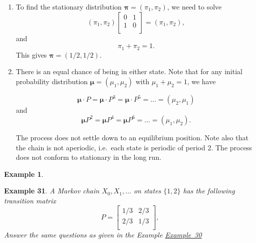 \documentclass[
]{book}
\theoremstyle{definition}
\theoremstyle{definition}
\newtheorem{example}{Example}[chapter]
\theoremstyle{definition}
\theoremstyle{definition}
\theoremstyle{remark}
\begin{document}
\begin{enumerate}
\def\labelenumi{\arabic{enumi}.}
\item
  To find the stationary distribution
  \(\boldsymbol{\pi} = (\pi_{1}, \pi_{2})\), we need to solve
  \[\left(\pi_{1},  \pi_{2}\right) \begin{bmatrix}
      0 & 1   \\
      1 & 0   \\
  \end{bmatrix} = \left(\pi_{1},  \pi_{2}\right),\] and
  \[\pi_{1} +  \pi_{2}  = 1.\] This gives
  \(\boldsymbol{\pi} = (1/2, 1/2).\)
\item
  There is an equal chance of being in either state. Note that for any
  initial probability distribution
  \(\boldsymbol{\mu} = (\mu_{1},\mu_{2})\) with \(\mu_{1}+\mu_{2}=1\), we
  have

  \[\boldsymbol{\mu} \cdot P=\boldsymbol{\mu} \cdot P^{3}=\boldsymbol{\mu} \cdot P^{5}=\ldots
  =(\mu_{2},\mu_{1})\] and
  \[\boldsymbol{\mu} P^{2}=\boldsymbol{\mu} P^{4}=\boldsymbol{\mu} P^{6}=\ldots = (\mu_{1},\mu_{2}).\]

  The process does not settle down to an equilibrium position. Note
  also that the chain is not aperiodic, i.e.~each state is periodic of
  period 2. The process does not conform to stationary in the long
  run.
\end{enumerate}

\begin{example}
\protect\hypertarget{exm:unlabeled-div-32}{}\label{exm:unlabeled-div-32}

\textbf{Example 31}. \emph{A Markov chain \(X_0, X_1, \ldots\) on states \(\{1,2\}\)
has the following transition matrix \[P = \begin{bmatrix}
    1/3 & 2/3   \\
    2/3 & 1/3   \\
\end{bmatrix},\] Answer the same questions as given in the Example
\protect\hyperlink{exampleLongTerm}{Example~30}}

\end{example}
\end{document}
